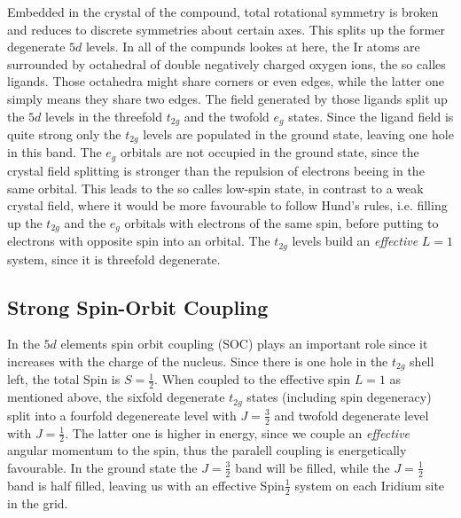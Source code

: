 \documentclass[a4paper,10pt]{report}
\begin{document}
Embedded in the crystal of the compound, total rotational symmetry is broken and reduces to discrete symmetries about certain axes. 
This splits up the former degenerate $5d$ levels. 
In all of the compunds lookes at here, the $\mathrm{Ir}$ atoms are surrounded by octahedral of double negatively charged oxygen ions, the so calles ligands. 
Those octahedra might share corners or even edges, while the latter one simply means they share two edges. 
%
%
The field generated by those ligands split up the $5d$ levels in the threefold $t_{2g}$ and the twofold $e_g$ states. 
Since the ligand field is quite strong
only the $t_{2g}$ levels are populated in the ground state, leaving one hole in this band. 
The $e_g$ orbitals are not occupied in the ground state, since the crystal field splitting is stronger than the repulsion of electrons beeing in the same orbital. 
This leads to the so calles low-spin state, in contrast to a weak crystal field, 
where it would be more favourable to follow Hund's rules, 
i.e. filling up the $t_{2g}$ and the $e_g$ orbitals with electrons of the same spin, before putting to electrons with opposite spin into an orbital.
The $t_{2g}$ levels build an \emph{effective} $L=1$ system, since it is threefold degenerate.

\subsection{Strong Spin-Orbit Coupling}

In the $5d$ elements spin orbit coupling (SOC) plays an important role since it increases with the charge of the nucleus.
Since there is one hole in the $t_{2g}$ shell left, the total Spin is $S=\frac12$. 
When coupled to the effective spin $L=1$ as mentioned above, 
the sixfold degenerate $t_{2g}$ states (including spin degeneracy) split into a fourfold degenereate level with $J=\frac32$
and twofold degenerate level with $J=\frac12$. The latter one is higher in energy, since we couple an \emph{effective} angular momentum to the spin,
thus the paralell coupling is energetically favourable.
In the ground state the $J=\frac32$ band will be filled, while the $J=\frac12$ band is half filled, leaving us with an effective Spin$\frac12$ system on each Iridium site in the grid.
\end{document}
